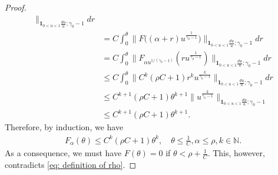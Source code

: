 \begin{proof}
\begin{align}
	\|_{\mathbf 1_{0<u<1}\frac{du}{u}; \gamma_0 - 1} dr\\
   &=  C\int_0^\theta \big \|F\big( (\alpha + r)u^{\frac{1}{\gamma_0 - 1}} \big )
	\big \|_{\mathbf 1_{0<u<1}\frac{du}{u}; \gamma_0 - 1} dr
	\\& =  C\int_0^\theta \|F_{\alpha u^{1/(\gamma_0 - 1)}}( ru^{\frac{1}{\gamma_0 - 1}}) \|_{\mathbf 1_{0<u<1}\frac{du}{u}; \gamma_0 - 1} dr
  \\&\leq C\int_0^ \theta \|C^k (\rho C+ 1) r^k u^{\frac{k}{\gamma_0 - 1} }
	\|_{\mathbf 1_{0<u<1}\frac{du}{u}; \gamma_0 - 1} dr
	\\&\leq C^{k+1} (\rho C + 1) \theta^{k+1} \|u^{\frac{k}{\gamma_0 - 1} } \|_{\mathbf 1_{0<u<1}\frac{du}{u}; \gamma_0 - 1}
\\&\leq C^{k+1} (\rho C+1) \theta^{k+1} .
\end{align}
	Therefore, by induction, we have
\begin{align}
	F_\alpha (\theta)
	\leq C^k(\rho C + 1) \theta^k,
	\quad \theta \leq \frac{1}{C}, \alpha \leq \rho, k \in \mathbb N.
\end{align}
	As a consequence, we must have $F(\theta) = 0$ if $\theta < \rho + \frac{1}{C}$.
	This, however, contradicts \eqref{eq: definition of rho}.
\end{proof}


